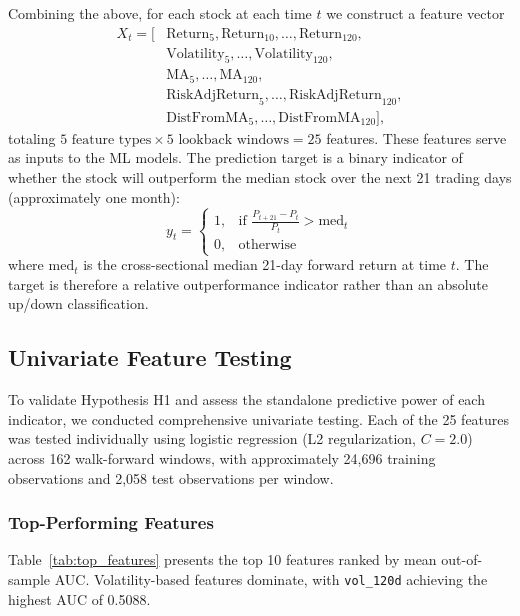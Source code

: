 \documentclass[conference]{IEEEtran}
\begin{document}
Combining the above, for each stock at each time $t$ we construct a feature vector
\[
\begin{aligned}
X_t = \big[ &\mathrm{Return}_5, \mathrm{Return}_{10}, \ldots, \mathrm{Return}_{120}, \\
& \mathrm{Volatility}_5, \ldots, \mathrm{Volatility}_{120}, \\
& \mathrm{MA}_5, \ldots, \mathrm{MA}_{120}, \\
& \mathrm{RiskAdjReturn}_5, \ldots, \mathrm{RiskAdjReturn}_{120}, \\
& \mathrm{DistFromMA}_5, \ldots, \mathrm{DistFromMA}_{120} \big],
\end{aligned}
\]
totaling $5\text{ feature types}\times 5\text{ lookback windows} = 25$ features. These features serve as inputs to the ML models. The prediction target is a binary indicator of whether the stock will outperform the median stock over the next 21 trading days (approximately one month):
\begin{equation}
y_t = \begin{cases} 1, & \text{if } \frac{P_{t+21}-P_t}{P_t} > \mathrm{med}_t \\ 0, & \text{otherwise}\end{cases}
\end{equation}
where $\mathrm{med}_t$ is the cross-sectional median 21-day forward return at time $t$. The target is therefore a relative outperformance indicator rather than an absolute up/down classification.

\subsection{Univariate Feature Testing}
To validate Hypothesis H1 and assess the standalone predictive power of each indicator, we conducted comprehensive univariate testing. Each of the 25 features was tested individually using logistic regression (L2 regularization, $C=2.0$) across 162 walk-forward windows, with approximately 24,696 training observations and 2,058 test observations per window.

\subsubsection{Top-Performing Features}
Table~\ref{tab:top_features} presents the top 10 features ranked by mean out-of-sample AUC. Volatility-based features dominate, with \texttt{vol\_120d} achieving the highest AUC of 0.5088.
\end{document}
